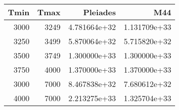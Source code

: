 \begin{tabular}{rrrr}
\toprule
      Tmin &       Tmax &      Pleiades &           M44 \\
\midrule
      3000 &       3249 &  4.781664e+32 &  1.131709e+33 \\
      3250 &       3499 &  5.870064e+32 &  5.715820e+32 \\
      3500 &       3749 &  1.300000e+33 &  1.300000e+33 \\
      3750 &       4000 &  1.370000e+33 &  1.370000e+33 \\
      3000 &       7000 &  8.467838e+32 &  7.680612e+32 \\
      4000 &       7000 &  2.213275e+33 &  1.325704e+33 \\
\bottomrule
\end{tabular}
